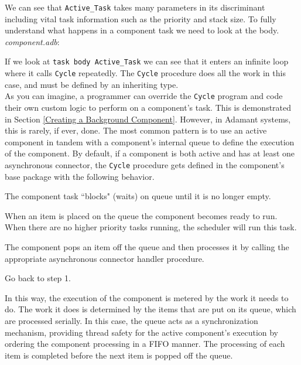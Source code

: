 We can see that \texttt{Active\_Task} takes many parameters in its discriminant including vital task information such as the priority and stack size. To fully understand what happens in a component task we need to look at the body. \\

\textit{component.adb}:

If we look at \texttt{task body Active\_Task} we can see that it enters an infinite loop where it calls \texttt{Cycle} repeatedly. The \texttt{Cycle} procedure does all the work in this case, and must be defined by an inheriting type. \\

As you can imagine, a programmer can override the \texttt{Cycle} program and code their own custom logic to perform on a component's task. This is demonstrated in Section \ref{Creating a Background Component}. However, in Adamant systems, this is rarely, if ever, done. The most common pattern is to use an active component in tandem with a component's internal queue to define the execution of the component. By default, if a component is both active and has at least one asynchronous connector, the \texttt{Cycle} procedure gets defined in the component's base package with the following behavior. \\

\vspace{5mm} %
\begin{spacedenumerate}
  \item The component task ``blocks" (waits) on queue until it is no longer empty.
  \item When an item is placed on the queue the component becomes ready to run. When there are no higher priority tasks running, the scheduler will run this task.
  \item The component pops an item off the queue and then processes it by calling the appropriate asynchronous connector handler procedure.
  \item Go back to step 1.
\end{spacedenumerate}
\vspace{5mm} %

In this way, the execution of the component is metered by the work it needs to do. The work it does is determined by the items that are put on its queue, which are processed serially. In this case, the queue acts as a synchronization mechanism, providing thread safety for the active component's execution by ordering the component processing in a FIFO manner. The processing of each item is completed before the next item is popped off the queue. \\

